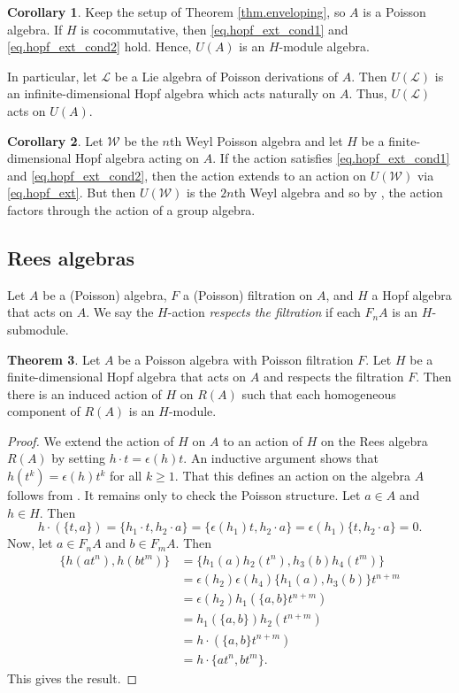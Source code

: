 \documentclass[reqno]{amsart}
\numberwithin{equation}{section}
\theoremstyle{definition}
\newtheorem{theorem}{Theorem}[section]
\newtheorem{corollary}[theorem]{Corollary}
\newcommand\cL{\mathcal L}
\newcommand\pw{\mathcal W}
\begin{document}
\begin{corollary}\label{cor.cocomm}
Keep the setup of Theorem \ref{thm.enveloping},
so $A$ is a Poisson algebra.
If $H$ is cocommutative, then \eqref{eq.hopf_ext_cond1} and \eqref{eq.hopf_ext_cond2} hold. Hence, $U(A)$ is an $H$-module algebra.

In particular, let $\cL$ be a Lie algebra of Poisson derivations of $A$. Then $U(\cL)$ is an infinite-dimensional Hopf algebra which acts naturally on $A$. Thus, $U(\cL)$ acts on $U(A)$.
\end{corollary}

\begin{corollary}\label{cor.weyl1}
Let $\pw$ be the $n$th Weyl Poisson algebra and let $H$ be a finite-dimensional Hopf algebra acting on $A$. If the action satisfies \eqref{eq.hopf_ext_cond1} and \eqref{eq.hopf_ext_cond2}, then the action extends to an action on $U(\pw)$ via \eqref{eq.hopf_ext}. But then $U(\pw)$ is the $2n$th Weyl algebra and so by \cite[Theorem 1.1]{CEW2}, the action factors through the action of a group algebra.
\end{corollary}


\subsection{Rees algebras}

Let $A$ be a (Poisson) algebra, $F$ a (Poisson) filtration on $A$, and $H$ a Hopf algebra that acts on $A$. We say the $H$-action \emph{respects the filtration} if each $F_n A$ is an $H$-submodule.

\begin{theorem}\label{thm.rees}
Let $A$ be a Poisson algebra with Poisson filtration $F$. Let $H$ be a finite-dimensional Hopf algebra that acts on $A$ and respects the filtration $F$. Then there is an induced action of $H$ on $R(A)$ such that each homogeneous component of $R(A)$ is an $H$-module.
\end{theorem}
\begin{proof}
We extend the action of $H$ on $A$ to an action of $H$ on the Rees algebra $R(A)$ by setting $h \cdot t = \epsilon(h)t$. An inductive argument shows that $h(t^k) = \epsilon(h)t^k$ for all $k \geq 1$. That this defines an action on the algebra $A$ follows from \cite[Lemma 4.2]{CWWZ2014}. It remains only to check the Poisson structure. Let $a \in A$ and $h \in H$. Then
\[
h \cdot (\{t,a\}) = \{ h_1 \cdot t, h_2 \cdot a\}
    = \{ \epsilon(h_1)t, h_2 \cdot a\}
    = \epsilon(h_1) \{ t, h_2 \cdot a\}
    = 0.
\]
Now, let $a \in F_n A$ and $b \in F_m A$. Then
\begin{align*}
\{ h(at^n),h(bt^m) \}
    &= \{ h_1(a)h_2(t^n), h_3(b)h_4(t^m) \} \\
    &= \epsilon(h_2)\epsilon(h_4) \{ h_1(a),h_3(b) \} t^{n+m} \\
    &= \epsilon(h_2) h_1(\{ a,b \} t^{n+m} )\\
    &= h_1(\{a,b\}) h_2(t^{n+m}) \\
    &= h \cdot \left(\{a,b\} t^{n+m} \right) \\
    &= h \cdot \{ at^n,bt^m \}.
\end{align*}
This gives the result.
\end{proof}
\end{document}

